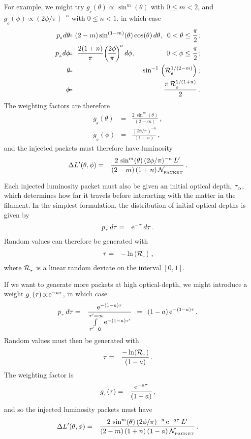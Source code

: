 \documentclass[usenatbib]{mn2e}
\newcommand{\subO}{_{_{\rm O}}}
\numberwithin{equation}{section}
\begin{document}
For example, we might try $g_{_\theta}(\theta)\!\propto\!\sin^m(\theta)$ with $0\!\leq\!m\!<\!2$, and $g_{_\phi}(\phi)\!\propto\!(2\phi /\pi)^{-n}$ with $0\!\leq\!n\!<\!1$, in which case
\begin{eqnarray}
p_{_\theta}d\theta\!\!&\!\!=\!\!&\!\!(2-m)\sin^{(1-m)}(\theta)\cos(\theta)\,d\theta,\;\;0<\theta\leq\frac{\pi}{2};\\
p_{_\phi}d\phi\!\!&\!\!=\!\!&\!\!\frac{2(1+n)}{\pi}\!\left(\!\frac{2\phi}{\pi}\!\right)^{\!n}d\phi,\hspace{1.60cm}0<\phi\leq\frac{\pi}{2};\\
\theta\!\!&\!\!=\!\!&\!\!\sin^{-1}\,\left({\cal R}_{_\theta}^{1/(2-m)}\right);\\
\phi\!\!&\!\!=\!\!&\!\!\frac{\pi\,{\cal R}_{_\phi}^{1/(1+n)}}{2}\,.
\end{eqnarray}
The weighting factors are therefore
\begin{eqnarray}
g_{_\theta}(\theta)&=&\frac{2\,\sin^m(\theta)}{(2-m)}\,,\\
g_{_\phi}(\phi)&=&\frac{(2\phi /\pi)^{-n}}{(1+n)}\,,
\end{eqnarray}
and the injected packets must therefore have luminosity
\begin{eqnarray}
\Delta L'(\theta,\phi)&=&\frac{2\,\sin^m(\theta)\,(2\phi /\pi)^{-n}\,L'}{(2-m)\,(1+n)\,{\cal N}_{_{\rm PACKET}}}\,.
\end{eqnarray}

Each injected luminosity packet must also be given an initial optical depth, $\tau\subO$, which determines how far it travels before interacting with the matter in the filament. In the simplest formulation, the distribution of initial optical depths is given by
\begin{eqnarray}
p_{_\tau}\,d\tau&=&{\rm e}^{-\tau}\,d\tau\,.
\end{eqnarray}
Random values can therefore be generated with
\begin{eqnarray}
\tau&=&-\ln\left({\cal R}_{_\tau}\right)\,,
\end{eqnarray}
where ${\cal R}_{_\tau}$ is a linear random deviate on the interval $[0,1]$.

If we want to generate more packets at high optical-depth, we might introduce a weight $g_{_\tau}(\tau)\!\propto\!{\rm e}^{-a\tau}$, in which case
\begin{eqnarray}
p_{_\tau}\,d\tau&=&\frac{{\rm e}^{-(1-a)\tau}}{\int\limits_{\tau'=0}^{\tau'=\infty}{\rm e}^{-(1-a)\tau'}}\;\,=\;\,(1-a)\,{\rm e}^{-(1-a)\tau}\,.
\end{eqnarray}
Random values must then be generated with
\begin{eqnarray}
\tau&=&\frac{-\ln({\cal R}_{_\tau})}{(1-a)}\,.
\end{eqnarray}
The weighting factor is
\begin{eqnarray}
g_{_\tau}(\tau)&=&\frac{{\rm e}^{-a\tau}}{(1-a)}\,,
\end{eqnarray}
and so the injected luminosity packets must have
\begin{eqnarray}
\Delta L'(\theta,\phi)&=&\frac{2\,\sin^m(\theta)\,(2\phi /\pi)^{-n}\,{\rm e}^{-a\tau}\,L'}{(2-m)\,(1+n)\,(1-a)\,{\cal N}_{_{\rm PACKET}}}\,.
\end{eqnarray}
\end{document}

